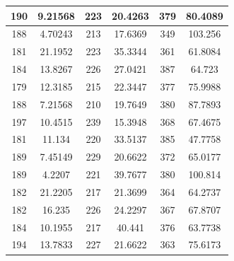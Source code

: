\documentclass{article}
\begin{document}
\begin{tabular}{cccccc}
190&9.21568&223&20.4263&379&80.4089 \\ \hline
188&4.70243&213&17.6369&349&103.256 \\ \hline
181&21.1952&223&35.3344&361&61.8084 \\ \hline
184&13.8267&226&27.0421&387&64.723 \\ \hline
179&12.3185&215&22.3447&377&75.9988 \\ \hline
188&7.21568&210&19.7649&380&87.7893 \\ \hline
197&10.4515&239&15.3948&368&67.4675 \\ \hline
181&11.134&220&33.5137&385&47.7758 \\ \hline
189&7.45149&229&20.6622&372&65.0177 \\ \hline
189&4.2207&221&39.7677&380&100.814 \\ \hline
182&21.2205&217&21.3699&364&64.2737 \\ \hline
182&16.235&226&24.2297&367&67.8707 \\ \hline
184&10.1955&217&40.441&376&63.7738 \\ \hline
194&13.7833&227&21.6622&363&75.6173 \\ \hline
\end{tabular}
\end{document}
